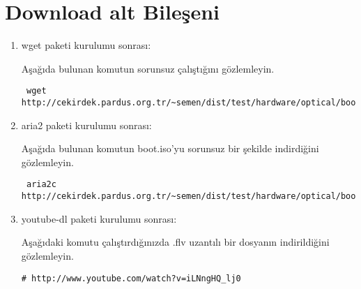 \documentclass[a4paper,10pt]{article}
\begin{document}
\section{Download alt Bileşeni}
\begin{enumerate}
\item wget paketi kurulumu sonrası:

Aşağıda bulunan komutun sorunsuz çalıştığını gözlemleyin.
\begin{verbatim}
 wget http://cekirdek.pardus.org.tr/~semen/dist/test/hardware/optical/boot.iso
\end{verbatim}


\item aria2 paketi kurulumu sonrası:

Aşağıda bulunan komutun boot.iso'yu sorunsuz bir şekilde indirdiğini gözlemleyin.
\begin{verbatim}
 aria2c http://cekirdek.pardus.org.tr/~semen/dist/test/hardware/optical/boot.iso
\end{verbatim}

 \item youtube-dl paketi kurulumu sonrası:

Aşağıdaki komutu çalıştırdığınızda .flv uzantılı bir dosyanın indirildiğini gözlemleyin.
\begin{verbatim}
# http://www.youtube.com/watch?v=iLNngHQ_lj0
\end{verbatim}

\end{enumerate}
\end{document}
